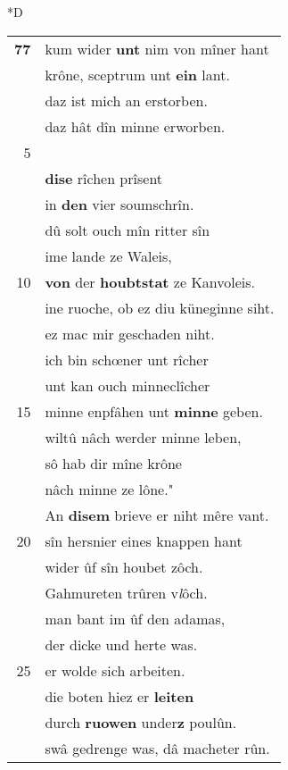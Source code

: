\documentclass[8pt,a4paper,notitlepage]{article}
\begin{document}
\begin{table}[ht]
\begin{minipage}[t]{0.5\linewidth}
\small
\begin{center}*D
\end{center}
\begin{tabular}{rl}
\textbf{77} & kum wider \textbf{unt} nim von mîner hant\\ 
 & krône, sceptrum unt \textbf{ein} lant.\\ 
 & daz ist mich an erstorben.\\ 
 & daz hât dîn minne erworben.\\ 
5 & \textit{\begin{large}H\end{large}}ab dir \textbf{ouch} ze soldiment\\ 
 & \textbf{dise} rîchen prîsent\\ 
 & in \textbf{den} vier soumschrîn.\\ 
 & dû solt ouch mîn ritter sîn\\ 
 & ime lande ze Waleis,\\ 
10 & \textbf{von} der \textbf{houbtstat} ze Kanvoleis.\\ 
 & ine ruoche, ob ez diu küneginne siht.\\ 
 & ez mac mir geschaden niht.\\ 
 & ich bin schœner unt rîcher\\ 
 & unt kan ouch minneclîcher\\ 
15 & minne enpfâhen unt \textbf{minne} geben.\\ 
 & wiltû nâch werder minne leben,\\ 
 & sô hab dir mîne krône\\ 
 & nâch minne ze lône."\\ 
 & An \textbf{disem} brieve er niht mêre vant.\\ 
20 & sîn hersnier eines knappen hant\\ 
 & wider ûf sîn houbet zôch.\\ 
 & Gahmureten trûren v\textit{l}ôch.\\ 
 & man bant im ûf den adamas,\\ 
 & der dicke und herte was.\\ 
25 & er wolde sich arbeiten.\\ 
 & die boten hiez er \textbf{leiten}\\ 
 & durch \textbf{ruowen} under\textbf{z} poulûn.\\ 
 & swâ gedrenge was, dâ macheter rûn.\\ 

\end{tabular}
\end{minipage}
\end{table}
\end{document}
